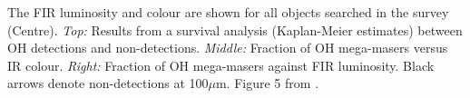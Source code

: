 \label{fig:oh_props} The FIR luminosity and colour are shown for all objects searched in the \citet{darling2002_paperIII} survey (Centre). {\it Top:} Results from a survival analysis (Kaplan-Meier estimates) between OH detections and non-detections. {\it Middle:} Fraction of OH mega-masers versus IR colour. {\it Right:} Fraction of OH mega-masers against FIR luminosity. Black arrows denote non-detections at 100$\mu$m. Figure 5 from \citet{darling2002_paperIII}. 